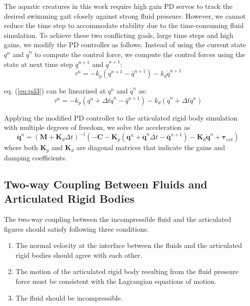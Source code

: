 The aquatic creatures in this work require high gain PD servos to track the desired swimming gait closely against strong fluid pressure. However, we cannot reduce the time step to accommodate stability due to the time-consuming fluid simulation. To achieve these two conflicting goals, large time steps and high gains, we modify the PD controller as follows. Instead of using the current state $q^n$ and $\dot{q}^n$ to compute the control force, we compute the control forces using the state at next time step $q^{n+1}$ and $\dot{q}^{n+1}$:
\begin{equation} \label{eq:pd3}
\tau^n=-k_p(q^{n+1}-\bar{q}^{n+1})-k_d\dot{q}^{n+1}
\end{equation}

eq. (\ref{eq:pd3}) can be linearized at $q^n$ and $\dot{q}^n$ as:
\begin{displaymath}
\tau^n=-k_p(q^n+\Delta t\dot{q}^n-\bar{q}^{n+1})-k_d(\dot{q}^n+\Delta t\ddot{q}^n)
\end{displaymath}

Applying the modified PD controller to the articulated rigid body simulation with multiple degrees of freedom, we solve the acceleration as
\begin{displaymath}
\label{eq:modifiedDynamics}
\mathbf{\ddot{q}}^n=(\mathbf{M}+\mathbf{K}_d\Delta t)^{-1}(-\mathbf{C}-\mathbf{K}_p(\mathbf{q}^n+\mathbf{\dot{q}}^n\Delta t-\bar{\mathbf{q}}^{n+1})-\mathbf{K}_d\mathbf{\dot{q}}^n+\mathbf{\tau}_{ext})
\end{displaymath}
where both $\mathbf{K}_p$ and $\mathbf{K}_d$ are diagonal matrices that indicate the gains and damping coefficients.

\subsection{Two-way Coupling Between Fluids and Articulated Rigid Bodies}
The two-way coupling between the incompressible fluid and the articulated figures should satisfy following three conditions.
\begin{enumerate}
\item The normal velocity at the interface between the fluids and the
articulated rigid bodies should agree with each other.
\item The motion of the articulated rigid body resulting from the fluid
pressure force must be consistent with the Lagrangian equations of motion.
\item The fluid should be incompressible.
\end{enumerate}

